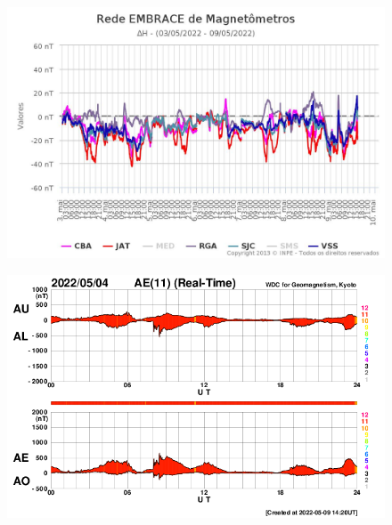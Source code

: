 \documentclass[a4paper, 10pt]{article}
\begin{document}
                     \begin{figure}[H]
    
                        \centering
   
                             \includegraphics[width=14cm]{./figures//figureGeomag_1.png}

                        \end{figure}

                     \begin{figure}[H]
    
                        \centering
   
                             \includegraphics[width=14cm]{./figures//figureGeomag_2.png}

                        \end{figure}
\end{document}
